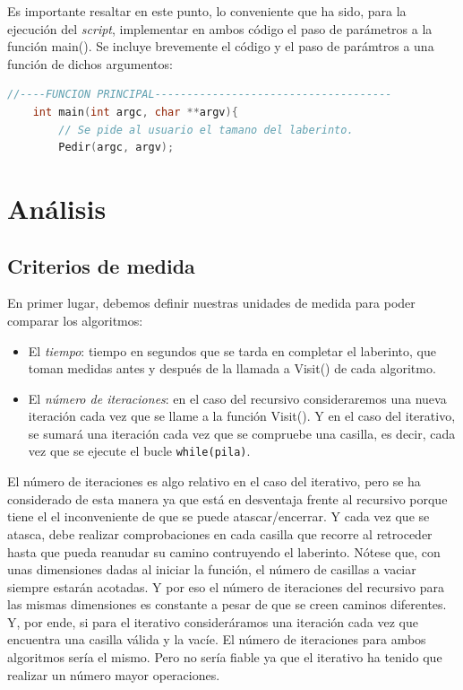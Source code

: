\documentclass[12pt,a4paper]{article}
\begin{document}
\vspace{0.2cm}
Es importante resaltar en este punto, lo conveniente que ha sido, para la ejecución del \textit{script}, implementar en ambos código el paso de parámetros a la función \textsf{main()}. Se incluye brevemente el código y el paso de parámtros a una función de dichos argumentos:
\lstset{style=mystyle}
\begin{lstlisting}[language=C++, title= Implementación de paso de argumentos al \textsf{main()}, frame=single, numbers=none]
	//----FUNCION PRINCIPAL-------------------------------------
	int main(int argc, char **argv){
		// Se pide al usuario el tamano del laberinto.
  		Pedir(argc, argv);
\end{lstlisting}

\clearpage
\section{Análisis}
\subsection{Criterios de medida}
En primer lugar, debemos definir nuestras unidades de medida para poder comparar los algoritmos:
\begin{itemize}
	\item El \textit{tiempo}: tiempo en segundos que se tarda en completar el laberinto, que toman medidas antes y después de la llamada a \textsf{Visit()} de cada algoritmo.
	\item El \textit{número de iteraciones}: en el caso del recursivo consideraremos una nueva iteración cada vez que se llame a la función \textsf{Visit()}. Y en el caso del iterativo, se sumará una iteración cada vez que se compruebe una casilla, es decir, cada vez que se ejecute el bucle \verb|while(pila)|. 

\end{itemize}

El número de iteraciones es algo relativo en el caso del iterativo, pero se ha considerado de esta manera ya que está en desventaja frente al recursivo porque tiene el el inconveniente de que se puede atascar/encerrar. Y cada vez que se atasca, debe realizar comprobaciones en cada casilla que recorre al retroceder hasta que pueda reanudar su camino contruyendo el laberinto. Nótese que, con unas dimensiones dadas al iniciar la función, el número de casillas a vaciar siempre estarán acotadas. Y por eso el número de iteraciones del recursivo para las mismas dimensiones es constante a pesar de que se creen caminos diferentes. Y, por ende, si para el iterativo consideráramos una iteración cada vez que encuentra una casilla válida y la vacíe. El número de iteraciones para ambos algoritmos sería el mismo. Pero no sería fiable ya que el iterativo ha tenido que realizar un número mayor operaciones.
\end{document}
